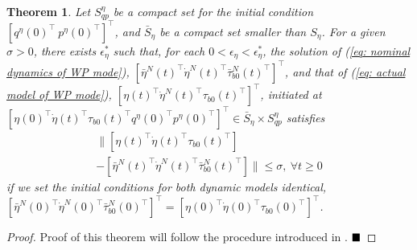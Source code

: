 \documentclass[letterpaper, 10 pt, conference]{ieeeconf}  %
\newtheorem{theorem}{Theorem}
\theoremstyle{definition}
\begin{document}
\begin{theorem} \label{thm: stability analysis on wire-pulling mode}
Let $S^{\eta}_{q p}$ be a compact set for the initial condition $[q^{\eta}(0)^{\top} \ p^{\eta}(0)^{\top}]^{\top}$, and $\bar{S}_{\eta}$ be a compact set smaller than $S_{\eta}$. For a given $\sigma > 0$, there exists $\epsilon^{*}_{\eta}$ such that, for each $0 < \epsilon_{\eta} < \epsilon^{*}_{\eta}$, the solution of (\ref{eq: nominal dynamics of WP mode}), $[\bar{\eta}^N(t)^{\top} \dot{\eta}^{N}(t)^{\top} \bar{\tau}^N_{b 0}(t)^{\top}]^{\top}$, and that of (\ref{eq: actual model of WP mode}), $[\eta(t)^{\top} \dot{\eta}^{N}(t)^{\top} \tau_{b 0}(t)^{\top}]^{\top}$, initiated at $[\eta(0)^{\top} \dot{\eta}(t)^{\top} \tau_{b 0}(t)^{\top} q^{\eta}(0)^{\top} p^{\eta}(0)^{\top}]^{\top} \in \bar{S}_{\eta} \times S^{\eta}_{q p}$ satisfies
\begin{multline*}
    \| [\eta(t)^{\top} \dot{\eta}(t)^{\top} \tau_{b 0}(t)^{\top} ] \\- [\bar{\eta}^{N}(t)^{\top} \dot{\eta}^{N}(t)^{\top} \bar{\tau}^{N}_{b 0}(t)^{\top} ] \| \leq \sigma, \ \forall t \geq 0
\end{multline*}
if we set the initial conditions for both dynamic models identical, $[\bar{\eta}^N(0)^{\top} \dot{\eta}^{N}(0)^{\top} \bar{\tau}^N_{b 0}(0)^{\top}]^{\top} = [\eta(0)^{\top} \dot{\eta}(0)^{\top} \tau_{b 0}(0)^{\top}]^{\top}$.
\end{theorem}
\begin{proof}
Proof of this theorem will follow the procedure introduced in \cite{kim2017robust}. $\hfill \blacksquare$
\end{proof}
\end{document}
